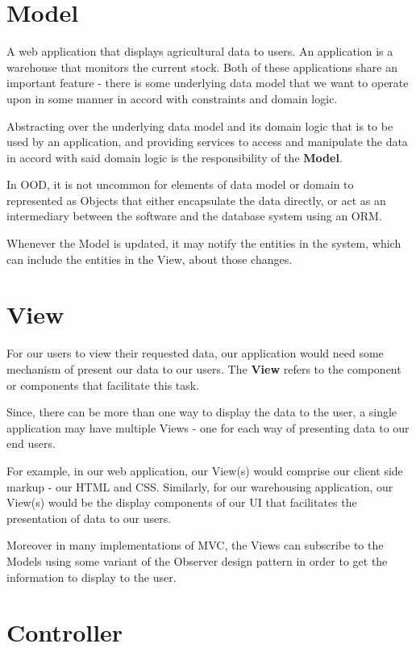 



\section{Model}

A web application that displays agricultural data to users. An application is a warehouse that monitors the current stock. Both of these applications share an important feature - there is some underlying data model that we want to operate upon in some manner in accord with constraints and  domain logic. 

Abstracting over the underlying data model and its domain logic that is to be used by an application, and providing services to access and manipulate the data in accord with said domain logic is the responsibility of the \textbf{Model}.

In OOD, it is not uncommon for elements of data model or domain to represented as Objects that either encapsulate the data directly, or act as an intermediary between the software and the database system using an ORM.

Whenever the Model is updated, it may notify the entities in the system, which can include the entities in the View, about those changes.


\section{View}

For our users to view their requested data, our application would need some mechanism of present our data to our users. The \textbf{View} refers to the component or components that facilitate this task. 

Since, there can be more than one way to display the data to the user, a single application may have multiple Views - one for each way of presenting data to our end users.

For example, in our web application, our View(s) would comprise our client side markup - our HTML and CSS. Similarly, for our warehousing application, our View(s) would be the display components of our UI that facilitates the presentation of data to our users.

Moreover in many implementations of MVC, the Views can  subscribe to the Models using some variant of the Observer design pattern in order to get the information to display to the user.

\section{Controller}

